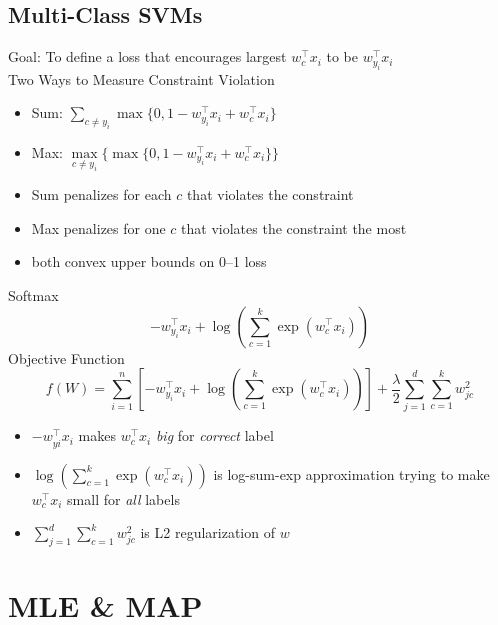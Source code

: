 \documentclass[10pt,landscape,a4paper]{article}
\begin{document}
\begin{multicols*}{5}
\subsection{Multi-Class SVMs}
Goal: To define a loss that encourages largest \(w_c^\intercal x_i\) to be \(w_{y_i}^\intercal x_i\) \\
Two Ways to Measure Constraint Violation
\begin{itemize}
    \item Sum: \(\sum\limits_{c \neq y_i} \max\{0, 1 - w_{y_i}^\intercal x_i + w_c^\intercal x_i\}\)
    \item Max: \(\max\limits_{c \neq y_i}\{\max\{0, 1 - w_{y_i}^\intercal x_i + w_c^\intercal x_i\}\}\)
\end{itemize}
\begin{itemize}
    \item Sum penalizes for each \(c\) that violates the constraint
    \item Max penalizes for one \(c\) that violates the constraint the most
    \item both convex upper bounds on 0--1 loss
\end{itemize}
Softmax
\begin{dmath*}
    -w_{y_i}^\intercal x_i + \log(\sum_{c=1}^{k} \exp(w_c^\intercal x_i))
\end{dmath*}
Objective Function
\begin{dmath*}
    f(W) = \sum_{i=1}^{n}[-w_{y_i}^\intercal x_i + \log(\sum_{c=1}^{k} \exp(w_c^\intercal x_i))] + \frac{\lambda}{2} \sum_{j=1}^{d} \sum_{c=1}^{k} w_{jc}^2
\end{dmath*}
\begin{itemize}
    \item \(-w_{yi}^\intercal x_i\) makes \(w_c^\intercal x_i\) \emph{big} for \emph{correct} label
    \item \(\log(\sum\limits_{c=1}^{k}\exp(w_c^\intercal x_i))\) is log-sum-exp approximation trying to make \(w_c^\intercal x_i\) small for \emph{all} labels
    \item \(\sum_{j=1}^{d} \sum_{c=1}^{k} w_{jc}^2\) is L2 regularization of \(w\)
\end{itemize}

\section{MLE \& MAP}


\end{multicols*}
\end{document}
